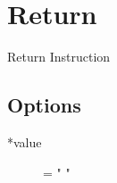 \section{Return}

Return Instruction

\subsection{Options}
\begin{description}
\item[*value] = " " 
\end{description}